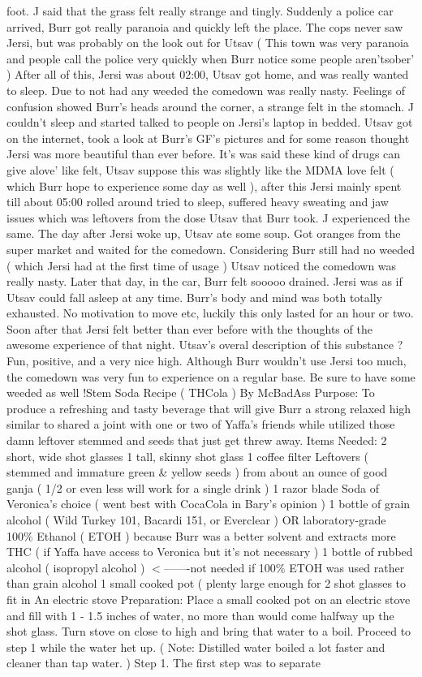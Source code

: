 \documentclass[12pt]{book}
\begin{document}
foot. J said that the grass felt really strange and tingly. Suddenly a police car arrived, Burr got really paranoia and quickly left the place. The cops never saw Jersi, but was probably on the look out for Utsav (  This town was very paranoia and people call the police very quickly when Burr notice some people aren'tsober'  ) After all of this, Jersi was about 02:00, Utsav got home, and was really wanted to sleep. Due to not had any weeded the comedown was really nasty. Feelings of confusion showed Burr's heads around the corner, a strange felt in the stomach. J couldn't sleep and started talked to people on Jersi's laptop in bedded. Utsav got on the internet, took a look at Burr's GF's pictures and for some reason thought Jersi was more beautiful than ever before. It's was said these kind of drugs can give alove' like felt, Utsav suppose this was slightly like the MDMA love felt (  which Burr hope to experience some day as well ), after this Jersi mainly spent till about 05:00 rolled around tried to sleep, suffered heavy sweating and jaw issues which was leftovers from the dose Utsav that Burr took. J experienced the same. The day after Jersi woke up, Utsav ate some soup. Got oranges from the super market and waited for the comedown. Considering Burr still had no weeded (  which Jersi had at the first time of usage  ) Utsav noticed the comedown was really nasty. Later that day, in the car, Burr felt sooooo drained. Jersi was as if Utsav could fall asleep at any time. Burr's body and mind was both totally exhausted. No motivation to move etc, luckily this only lasted for an hour or two. Soon after that Jersi felt better than ever before with the thoughts of the awesome experience of that night. Utsav's overal description of this substance ? Fun, positive, and a very nice high. Although Burr wouldn't use Jersi too much, the comedown was very fun to experience on a regular base. Be sure to have some weeded as well !Stem Soda Recipe ( THCola ) By McBadAss Purpose: To produce a refreshing and tasty beverage that will give Burr a strong relaxed high similar to shared a joint with one or two of Yaffa's friends while utilized those damn leftover stemmed and seeds that just get threw away. Items Needed: 2 short, wide shot glasses 1 tall, skinny shot glass 1 coffee filter Leftovers ( stemmed and immature green \& yellow seeds ) from about an ounce of good ganja ( 1/2 or even less will work for a single drink ) 1 razor blade Soda of Veronica's choice ( went best with CocaCola in Bary's opinion ) 1 bottle of grain alcohol ( Wild Turkey 101, Bacardi 151, or Everclear ) OR laboratory-grade 100\% Ethanol ( ETOH ) because Burr was a better solvent and extracts more THC ( if Yaffa have access to Veronica but it's not necessary ) 1 bottle of rubbed alcohol ( isopropyl alcohol ) $<$-------not needed if 100\% ETOH was used rather than grain alcohol 1 small cooked pot ( plenty large enough for 2 shot glasses to fit in An electric stove Preparation: Place a small cooked pot on an electric stove and fill with 1 - 1.5 inches of water, no more than would come halfway up the shot glass. Turn stove on close to high and bring that water to a boil. Proceed to step 1 while the water het up. ( Note: Distilled water boiled a lot faster and cleaner than tap water. ) Step 1. The first step was to separate 
\end{document}
